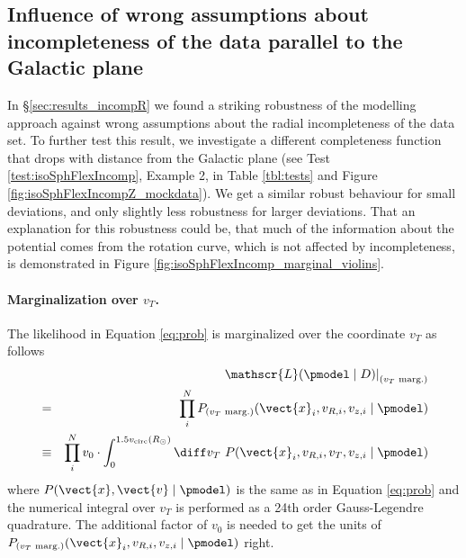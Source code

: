 \subsection{Influence of wrong assumptions about incompleteness of the data parallel to the Galactic plane} \label{sec:incompZ}

In \S\ref{sec:results_incompR} we found a striking robustness of the \RM modelling approach against wrong assumptions about the radial incompleteness of the data set. To further test this result, we investigate a different completeness function that drops with distance from the Galactic plane (see Test \ref{test:isoSphFlexIncomp}, Example 2, in Table \ref{tbl:tests} and Figure \ref{fig:isoSphFlexIncompZ_mockdata}). We get a similar robust behaviour for small deviations, and only slightly less robustness for larger deviations. That an explanation for this robustness could be, that much of the information about the potential comes from the rotation curve, which is not affected by incompleteness, is demonstrated in Figure \ref{fig:isoSphFlexIncomp_marginal_violins}.

\paragraph{Marginalization over $v_T$.} The likelihood in Equation \ref{eq:prob} is marginalized over the coordinate $v_T$ as follows
\begin{eqnarray*}
&&\left. \mathscr{L}(\pmodel \mid D)\right|_\text{($v_T$ marg.)}\\
&=& \prod_i^N P_\text{($v_T$ marg.)} (\vect{x}_i,v_{R,i},v_{z,i} \mid \pmodel)\\
&\equiv& \prod_i^N v_0 \cdot \int_0^{1.5v_\text{circ}(R_\odot)} \diff v_T \ P(\vect{x}_i,v_{R,i},v_{T},v_{z,i} \mid \pmodel )
\end{eqnarray*}
where $P(\vect{x},\vect{v} \mid \pmodel)$ is the same as in Equation \ref{eq:prob} and the numerical integral over $v_T$ is performed as a 24th order Gauss-Legendre quadrature. The additional factor of $v_0$ is needed to get the units of $P_\text{($v_T$ marg.)} (\vect{x}_i,v_{R,i},v_{z,i} \mid \pmodel)$ right.

